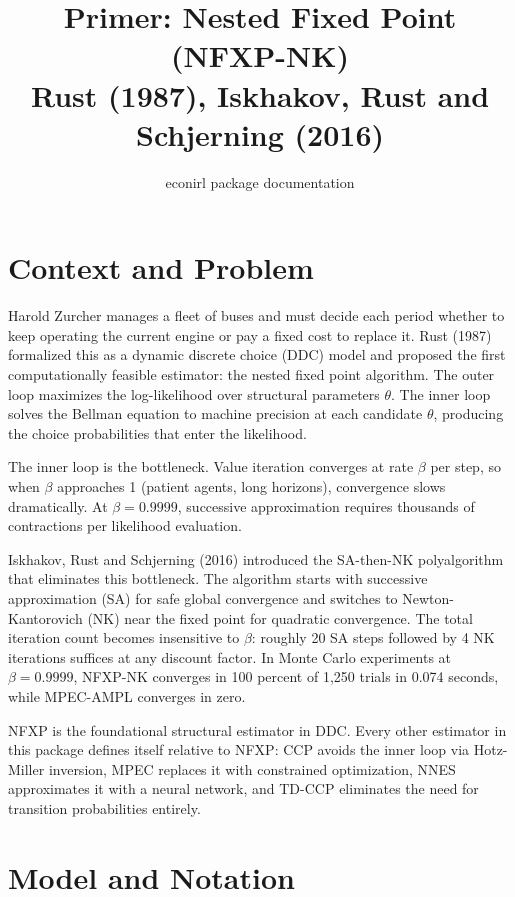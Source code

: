 \documentclass[11pt]{article}
\title{Primer: Nested Fixed Point (NFXP-NK)\\[4pt]
\large Rust (1987), Iskhakov, Rust and Schjerning (2016)}
\author{econirl package documentation}
\date{}
\begin{document}
\maketitle

\section{Context and Problem}

Harold Zurcher manages a fleet of buses and must decide each period whether to keep operating the current engine or pay a fixed cost to replace it.
Rust (1987) formalized this as a dynamic discrete choice (DDC) model and proposed the first computationally feasible estimator: the nested fixed point algorithm.
The outer loop maximizes the log-likelihood over structural parameters $\theta$.
The inner loop solves the Bellman equation to machine precision at each candidate $\theta$, producing the choice probabilities that enter the likelihood.

The inner loop is the bottleneck.
Value iteration converges at rate $\beta$ per step, so when $\beta$ approaches 1 (patient agents, long horizons), convergence slows dramatically.
At $\beta = 0.9999$, successive approximation requires thousands of contractions per likelihood evaluation.

Iskhakov, Rust and Schjerning (2016) introduced the SA-then-NK polyalgorithm that eliminates this bottleneck.
The algorithm starts with successive approximation (SA) for safe global convergence and switches to Newton-Kantorovich (NK) near the fixed point for quadratic convergence.
The total iteration count becomes insensitive to $\beta$: roughly 20 SA steps followed by 4 NK iterations suffices at any discount factor.
In Monte Carlo experiments at $\beta = 0.9999$, NFXP-NK converges in 100 percent of 1,250 trials in 0.074 seconds, while MPEC-AMPL converges in zero.

NFXP is the foundational structural estimator in DDC.
Every other estimator in this package defines itself relative to NFXP: CCP avoids the inner loop via Hotz-Miller inversion, MPEC replaces it with constrained optimization, NNES approximates it with a neural network, and TD-CCP eliminates the need for transition probabilities entirely.

\section{Model and Notation}
\end{document}
